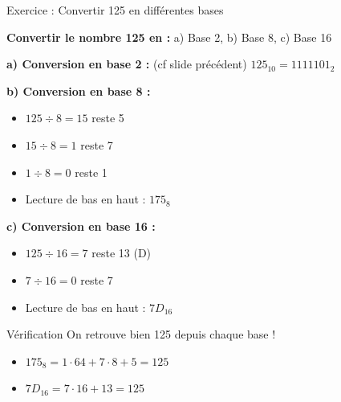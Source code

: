 \documentclass[aspectratio=1610]{beamer}
\begin{document}
\begin{frame}{Exercice : Convertir 125 en différentes bases}

  \textbf{Convertir le nombre 125 en :} a) Base 2, b) Base 8, c) Base 16

  \pause
  \textbf{a) Conversion en base 2 :} (cf slide précédent) $125_{10} = 1111101_2$

  \vspace{0.5em}

  \textbf{b) Conversion en base 8 :}
  \pause
  \begin{itemize}
    \item $125 \div 8 = 15$ reste 5
    \item $15 \div 8 = 1$ reste 7
    \item $1 \div 8 = 0$ reste 1
    \item Lecture de bas en haut : $175_8$
  \end{itemize}

  \textbf{c) Conversion en base 16 :}
  \pause
  \begin{itemize}
    \item $125 \div 16 = 7$ reste 13 (D)
    \item $7 \div 16 = 0$ reste 7
    \item Lecture de bas en haut : $7D_{16}$
  \end{itemize}

  \vspace{0.5em}

  \begin{exampleblock}{Vérification}
    On retrouve bien 125 depuis chaque base !
    \begin{itemize}
      \item $175_8 = 1 \cdot 64 + 7 \cdot 8 + 5 = 125$ 
      \item $7D_{16} = 7 \cdot 16 + 13 = 125$ 
    \end{itemize}
  \end{exampleblock}

\end{frame}
\end{document}
